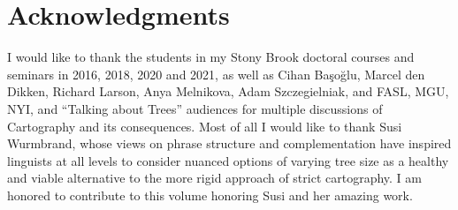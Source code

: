 \documentclass[output=paper]{langscibook}
\begin{document}
\section*{Acknowledgments}
I would like to thank the students in my Stony Brook doctoral courses and seminars in 2016, 2018, 2020 and 2021, as well as Cihan Başoğlu, Marcel den Dikken, Richard Larson, Anya Melnikova, Adam Szczegielniak, and FASL, MGU, NYI, and ``Talking about Trees'' audiences for multiple discussions of Cartography and its consequences. Most of all I would like to thank Susi Wurmbrand, whose views on phrase structure and complementation have inspired linguists at all levels to consider nuanced options of varying tree size as a healthy and viable alternative to the more rigid approach of strict cartography. I am honored to contribute to this volume honoring Susi and her amazing work. 

\printbibliography[heading=subbibliography,notkeyword=this]
\end{document}
